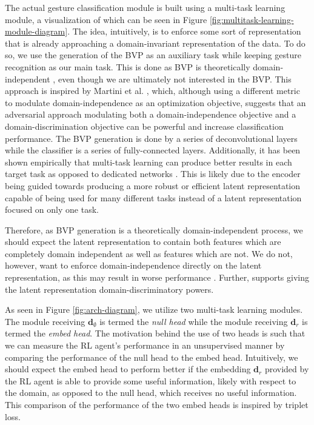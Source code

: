 The actual gesture classification module is built using a multi-task learning module, a visualization of which can be seen in Figure \ref{fig:multitask-learning-module-diagram}.
The idea, intuitively, is to enforce some sort of representation that is already approaching a domain-invariant representation of the data.
To do so, we use the generation of the BVP as an auxiliary task while keeping gesture recognition as our main task.
This is done as BVP is theoretically domain-independent \cite{zheng2019zero}, even though we are ultimately not interested in the BVP.
This approach is inspired by Martini et al. \cite{martini2021domain}, which, although using a different metric to modulate domain-independence as an optimization objective, suggests that an adversarial approach modulating both a domain-independence objective and a domain-discrimination objective can be powerful and increase classification performance.
The BVP generation is done by a series of deconvolutional layers while the classifier is a series of fully-connected layers.
Additionally, it has been shown empirically that multi-task learning can produce better results in each target task as opposed to dedicated networks \cite{tuggener2021deepscoresv2}.
This is likely due to the encoder being guided towards producing a more robust or efficient latent representation capable of being used for many different tasks instead of a latent representation focused on only one task.

Therefore, as BVP generation is a theoretically domain-independent process, we should expect the latent representation to contain both features which are completely domain independent as well as features which are not.
We do not, however, want to enforce domain-independence directly on the latent representation, as this may result in worse performance \cite{van2022insights}.
Further, \cite{martini2021domain} supports giving the latent representation domain-discriminatory powers.

As seen in Figure \ref{fig:arch-diagram}, we utilize two multi-task learning modules. The module receiving $\boldsymbol{d}_\emptyset$ is termed the \textit{null head} while the module receiving $\boldsymbol{d}_r$ is termed the \textit{embed head}. 
The motivation behind the use of two heads is such that we can measure the RL agent's performance in an unsupervised manner by comparing the performance of the null head to the embed head.
Intuitively, we should expect the embed head to perform better if the embedding $\boldsymbol{d}_r$ provided by the RL agent is able to provide some useful information, likely with respect to the domain, as opposed to the null head, which receives no useful information.
This comparison of the performance of the two embed heads is inspired by triplet loss.

